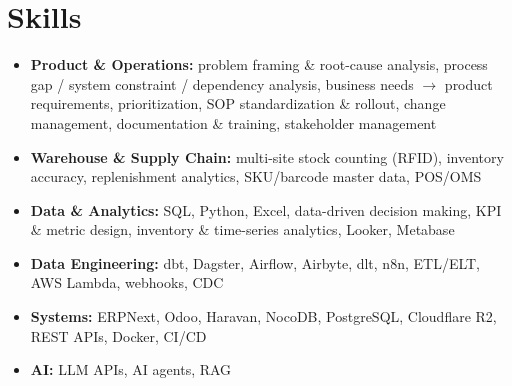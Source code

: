 
\section{Skills}
\begin{itemize}[leftmargin=30pt, label=\textbullet, itemsep=1pt]
  \item \textbf{Product \& Operations:} problem framing \& root-cause analysis, process gap / system constraint / dependency analysis, business needs $\rightarrow$ product requirements, prioritization, SOP standardization \& rollout, change management, documentation \& training, stakeholder management
  \item \textbf{Warehouse \& Supply Chain:} multi-site stock counting (RFID), inventory accuracy, replenishment analytics, SKU/barcode master data, POS/OMS
  \item \textbf{Data \& Analytics:} SQL, Python, Excel, data-driven decision making, KPI \& metric design, inventory \& time-series analytics, Looker, Metabase
  \item \textbf{Data Engineering:} dbt, Dagster, Airflow, Airbyte, dlt, n8n, ETL/ELT, AWS Lambda, webhooks, CDC
  \item \textbf{Systems:} ERPNext, Odoo, Haravan, NocoDB, PostgreSQL, Cloudflare R2, REST APIs, Docker, CI/CD
  \item \textbf{AI:} LLM APIs, AI agents, RAG
\end{itemize}

